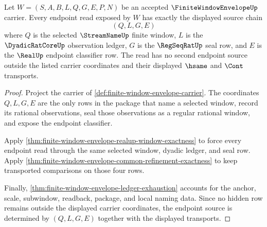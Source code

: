 \begin{theorem}
\label{thm:finite-window-envelope-endpoint-source-determinacy}
Let $W=(S,A,B,L,Q,G,E,P,N)$ be an accepted $\FiniteWindowEnvelopeUp$ carrier. Every endpoint read exposed by $W$ has exactly the displayed source chain
$$
(Q,L,G,E)
$$
where $Q$ is the selected $\StreamNameUp$ finite window, $L$ is the $\DyadicRatCoreUp$ observation ledger, $G$ is the $\RegSeqRatUp$ seal row, and $E$ is the $\RealUp$ endpoint classifier row. The read has no second endpoint source outside the listed carrier coordinates and their displayed $\hsame$ and $\Cont$ transports.
\end{theorem}
\begin{proof}
Project the carrier of \autoref{def:finite-window-envelope-carrier}. The coordinates $Q,L,G,E$ are the only rows in the package that name a selected window, record its rational observations, seal those observations as a regular rational window, and expose the endpoint classifier.

Apply \autoref{thm:finite-window-envelope-realup-window-exactness} to force every endpoint read through the same selected window, dyadic ledger, and seal row. Apply \autoref{thm:finite-window-envelope-common-refinement-exactness} to keep transported comparisons on those four rows.

Finally, \autoref{thm:finite-window-envelope-ledger-exhaustion} accounts for the anchor, scale, subwindow, readback, package, and local naming data. Since no hidden row remains outside the displayed carrier coordinates, the endpoint source is determined by $(Q,L,G,E)$ together with the displayed transports.
\end{proof}

